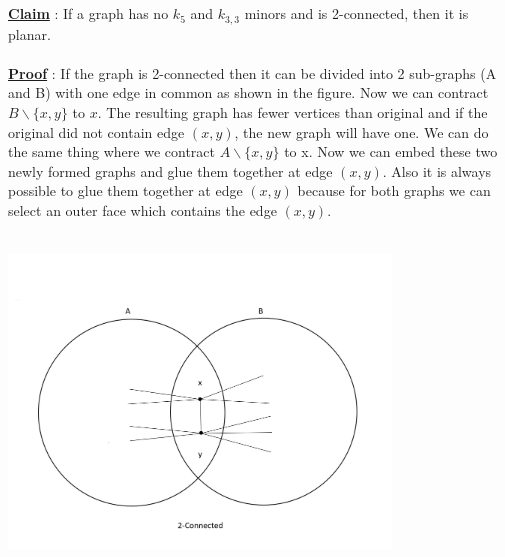 \documentclass{article}
\begin{document}
    \\\\
    \underline{\textbf{Claim}} : If a graph has no $k_{5}$ and $k_{3,3}$ minors and is 2-connected, then it is planar. 
    \\\\
    \underline{\textbf{Proof}} : If the graph is 2-connected then it  can be divided into 2 sub-graphs (A and B) with one edge in common as shown in the figure. Now we can contract $B \backslash \{x,y\}$ to $x$. The resulting graph has fewer vertices than original and if the original did not contain edge $(x,y)$, the new graph will have one. We can do the same thing where we contract $A \backslash \{x,y\}$ to x. Now we can embed these two newly formed graphs and glue them together at edge $(x,y)$. Also it is always possible to glue them together at edge $(x,y)$ because for both graphs we can select an outer face which contains the edge $(x,y)$.
    \\\\
    \centerline{\includegraphics[width=4in]{Images/2conngraph.PNG}}
    \newpage
\end{document}
